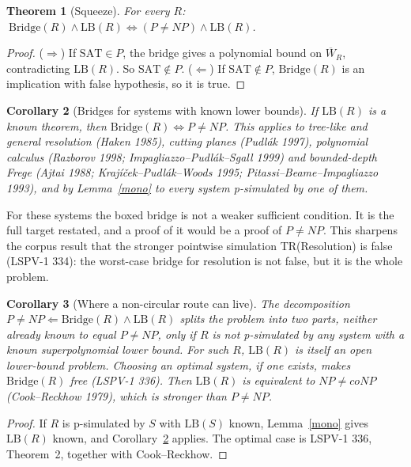 \documentclass[11pt]{article}
\newtheorem{theorem}{Theorem}
\newtheorem{corollary}[theorem]{Corollary}
\theoremstyle{definition}
\newcommand{\W}{\overline W}
\begin{document}
\begin{theorem}[Squeeze]\label{squeeze}
For every $R$: $\ \mathrm{Bridge}(R)\wedge\mathrm{LB}(R)\iff (P\ne NP)\wedge\mathrm{LB}(R)$.
\end{theorem}
\begin{proof}
($\Rightarrow$) If $\mathrm{SAT}\in P$, the bridge gives a polynomial bound on $\W_R$, contradicting $\mathrm{LB}(R)$. So $\mathrm{SAT}\notin P$. ($\Leftarrow$) If $\mathrm{SAT}\notin P$, $\mathrm{Bridge}(R)$ is an implication with false hypothesis, so it is true.
\end{proof}

\begin{corollary}[Bridges for systems with known lower bounds]\label{known}
If $\mathrm{LB}(R)$ is a known theorem, then $\mathrm{Bridge}(R)\iff P\ne NP$. This applies to tree-like and general resolution (Haken 1985), cutting planes (Pudl\'ak 1997), polynomial calculus (Razborov 1998; Impagliazzo--Pudl\'ak--Sgall 1999) and bounded-depth Frege (Ajtai 1988; Kraj\'i\v{c}ek--Pudl\'ak--Woods 1995; Pitassi--Beame--Impagliazzo 1993), and by Lemma~\ref{mono} to every system p-simulated by one of them.
\end{corollary}
\noindent For these systems the boxed bridge is not a weaker sufficient condition. It is the full target restated, and a proof of it would be a proof of $P\ne NP$. This sharpens the corpus result that the stronger pointwise simulation TR(Resolution) is false (LSPV-1 334): the worst-case bridge for resolution is not false, but it is the whole problem.

\begin{corollary}[Where a non-circular route can live]\label{where}
The decomposition $P\ne NP\Leftarrow\mathrm{Bridge}(R)\wedge\mathrm{LB}(R)$ splits the problem into two parts, neither already known to equal $P\ne NP$, only if $R$ is not p-simulated by any system with a known superpolynomial lower bound. For such $R$, $\mathrm{LB}(R)$ is itself an open lower-bound problem. Choosing an optimal system, if one exists, makes $\mathrm{Bridge}(R)$ free (LSPV-1 336). Then $\mathrm{LB}(R)$ is equivalent to $NP\ne coNP$ (Cook--Reckhow 1979), which is stronger than $P\ne NP$.
\end{corollary}
\begin{proof}
If $R$ is p-simulated by $S$ with $\mathrm{LB}(S)$ known, Lemma~\ref{mono} gives $\mathrm{LB}(R)$ known, and Corollary~\ref{known} applies. The optimal case is LSPV-1 336, Theorem~2, together with Cook--Reckhow.
\end{proof}
\end{document}
